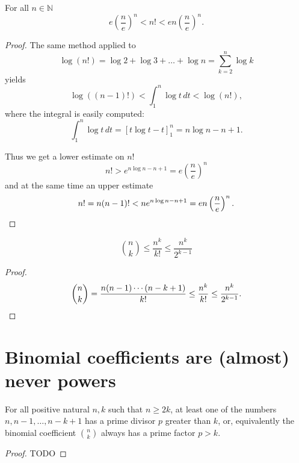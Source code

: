 \begin{theorem}
    \label{thm:estimate_factorials}
    \leanok
    For all \(n \in \mathbb{N}\)
    \[
    e\left(\frac{n}{e}\right)^n < n! < en\left(\frac{n}{e}\right)^n.
    \]
\end{theorem}
\begin{proof}
    The same method applied to
    \[
    \log(n!) = \log 2 + \log 3 + \dots + \log n = \sum_{k=2}^{n} \log k
    \]
    yields
    \[
    \log((n-1)!) < \int_{1}^{n} \log t \, dt < \log(n!),
    \]
    where the integral is easily computed:
    \[
    \int_{1}^{n} \log t \, dt = \left[t\log t - t\right]_{1}^{n} = n\log n - n + 1.
    \]
    
    Thus we get a lower estimate on $n!$
    \[
    n! > e^{n\log n - n + 1} = e\left(\frac{n}{e}\right)^n
    \]
    and at the same time an upper estimate
    \[
    n! = n(n-1)! < n e^{n\log n - n + 1} = en\left(\frac{n}{e}\right)^n. \qedhere
    \]
\end{proof}

\begin{theorem}
    \label{thm:estimate_binomial_coefficient}
    \leanok
    \[\binom{n}{k} \le \frac{n^k}{k!} \le \frac{n^k}{2^{k - 1}}\]
\end{theorem}
\begin{proof}
    \[
    \binom{n}{k} = \frac{n (n-1) \cdots (n-k+1)}{k!} \le \frac{n^k}{k!} \le \frac{n^k}{2^{k-1}}. \qedhere
    \]
\end{proof}


\chapter{Binomial coefficients are (almost) never powers}


\begin{theorem}
    \label{sylvester}
    \leanok
    For all positive natural \(n, k\) such that \(n \ge 2k\), at least one of the numbers
    \(n, n - 1, \dots, n - k + 1\) has a prime divisor $p$ greater than $k$,
    or, equivalently the binomial coefficient
    \(\binom{n}{k}\) always has a prime factor \(p > k\).
\end{theorem}
\begin{proof}
    TODO
\end{proof}


